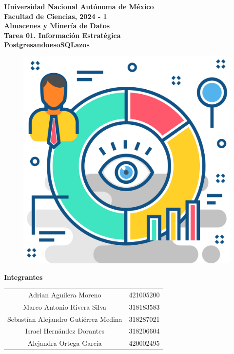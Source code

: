 \begin{titlepage}
\begin{center}
\textbf{\LARGE Universidad Nacional Autónoma de México}\\[0.5cm] 
\textbf{\Large Facultad de Ciencias, 2024 - 1}\\[0.2cm]
\vspace{20pt}
\textbf{\Large Almacenes y Minería de Datos}\\
\vspace{3pt}
\myrule[1pt][7pt]
\textbf{\LARGE  Tarea 01. Información Estratégica}\\
\vspace{15pt}
\textbf{\LARGE PostgresandoesoSQLazos}\\
\myrule[1pt][7pt]
\vspace{35pt}
\begin{figure}[htbp]
  \centering
  \includegraphics[scale=0.8]{../img/business.png}
\end{figure}
\textbf{\Large Integrantes}\\
\vspace{15pt}


\begin{tabular}{c c}
    Adrian Aguilera Moreno & 421005200 \\
    Marco Antonio Rivera Silva & 318183583 \\
    Sebastían Alejandro Gutiérrez Medina & 318287021 \\
    Israel Hernández Dorantes & 318206604 \\
    Alejandra Ortega García & 420002495 \\
\end{tabular}

\end{center}
\par
\end{titlepage}
